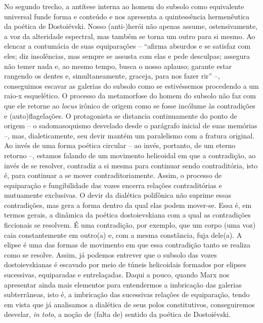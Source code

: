 No segundo trecho, a antítese interna ao homem do subsolo como
equivalente universal funde forma e conteúdo e nos apresenta a
quintessência hermenêutica da poética de Dostoiévski. Nosso (anti-)herói
não apenas assume, ostensivamente, a voz da alteridade espectral, mas
também se torna um outro para si mesmo. Ao elencar a contumácia de suas
equiparações -- ``afirma absurdos e se satisfaz com eles; diz
insolências, mas sempre se assusta com elas e pede desculpas; assegura
não temer nada e, ao mesmo tempo, busca o nosso aplauso; garante estar
rangendo os dentes e, simultaneamente, graceja, para nos fazer rir'' --,
conseguimos escavar as galerias do subsolo como se estivéssemos
procedendo a um raio-x esquelético. O processo da metamorfose do homem
do subsolo não faz com que ele retorne ao \emph{locus} irônico de origem
como se fosse incólume às contradições e (auto)flagelações. O
protagonista se distancia continuamente do ponto de origem -- o
sadomasoquismo desvelado desde o parágrafo inicial de suas memórias --,
mas, dialeticamente, seu devir mantém um paralelismo com a fratura
original. Ao invés de uma forma poética circular -- ao invés, portanto,
de um eterno retorno --, estamos falando de um movimento helicoidal em
que a contradição, ao invés de se resolver, contradiz a si mesma para
continuar sendo contraditória, isto é, para continuar a se mover
contraditoriamente. Assim, o processo de equiparação e fungibilidade das
vozes encerra relações contraditórias e mutuamente exclusivas. O devir
da dialética polifônica não suprime essas contradições, mas gera a forma
dentro da qual elas podem mover-se. Essa é, em termos gerais, a dinâmica
da poética dostoievskiana com a qual as contradições ficcionais se
resolvem. É uma contradição, por exemplo, que um corpo (uma voz) caia
constantemente em outro(a) e, com a mesma constância, fuja dele(a). A
elipse é uma das formas de movimento em que essa contradição tanto se
realiza como se resolve. Assim, já podemos entrever que o subsolo das
vozes dostoievskianas é escavado por meio de túneis helicoidais formados
por elipses sucessivas, equiparadas e entrelaçadas. Daqui a pouco,
quando Marx nos apresentar ainda mais elementos para entendermos a
imbricação das galerias subterrâneas, isto é, a imbricação das
sucessivas relações de equiparação, tendo em vista que já analisamos a
dialética de seus polos constitutivos, conseguiremos desvelar, \emph{in
toto}, a noção de (falta de) sentido da poética de Dostoiévski.


